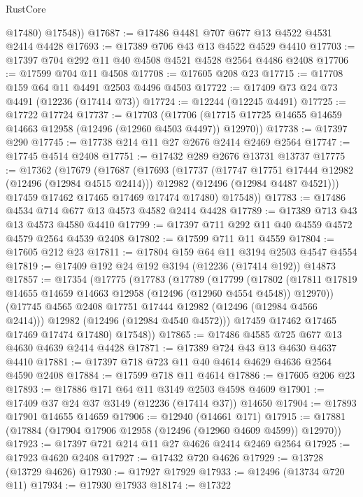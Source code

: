 \begin{lexlean}{RustCore}
\begin{coremodule}
          @17480)
        @17548))
@17687 := @17486 @4481 @707 @677 @13 @4522 @4531 @2414 @4428
@17693 := @17389 @706 @43 @13 @4522 @4529 @4410
@17703 := @17397 @704 @292 @11 @40 @4508 @4521 @4528 @2564 @4486 @2408
@17706 := @17599 @704 @11 @4508
@17708 := @17605 @208 @23
@17715 := @17708 @159 @64 @11 @4491 @2503 @4496 @4503
@17722 := @17409 @73 @24 @73 @4491 (@12236 (@17414 @73))
@17724 := @12244 (@12245 @4491)
@17725 := @17722 @17724
@17737 := @17703
    (@17706 (@17715 @17725 @14655 @14659 @14663 @12958 (@12496 (@12960 @4503 @4497)) @12970))
@17738 := @17397 @290
@17745 := @17738 @214 @11 @27 @2676 @2414 @2469 @2564
@17747 := @17745 @4514 @2408
@17751 := @17432 @289 @2676 @13731 @13737
@17775 := @17362
    (@17679
      (@17687
        (@17693
          (@17737
            (@17747 @17751 @17444 @12982 (@12496 (@12984 @4515 @2414)))
            @12982
            (@12496 (@12984 @4487 @4521)))
          @17459
          @17462
          @17465
          @17469
          @17474
          @17480)
        @17548))
@17783 := @17486 @4534 @714 @677 @13 @4573 @4582 @2414 @4428
@17789 := @17389 @713 @43 @13 @4573 @4580 @4410
@17799 := @17397 @711 @292 @11 @40 @4559 @4572 @4579 @2564 @4539 @2408
@17802 := @17599 @711 @11 @4559
@17804 := @17605 @212 @23
@17811 := @17804 @159 @64 @11 @3194 @2503 @4547 @4554
@17819 := @17409 @192 @24 @192 @3194 (@12236 (@17414 @192)) @14873
@17857 := @17354
    (@17775
      (@17783
        (@17789
          (@17799
            (@17802
              (@17811 @17819 @14655 @14659 @14663 @12958 (@12496 (@12960 @4554 @4548)) @12970))
            (@17745 @4565 @2408 @17751 @17444 @12982 (@12496 (@12984 @4566 @2414)))
            @12982
            (@12496 (@12984 @4540 @4572)))
          @17459
          @17462
          @17465
          @17469
          @17474
          @17480)
        @17548))
@17865 := @17486 @4585 @725 @677 @13 @4630 @4639 @2414 @4428
@17871 := @17389 @724 @43 @13 @4630 @4637 @4410
@17881 := @17397 @718 @723 @11 @40 @4614 @4629 @4636 @2564 @4590 @2408
@17884 := @17599 @718 @11 @4614
@17886 := @17605 @206 @23
@17893 := @17886 @171 @64 @11 @3149 @2503 @4598 @4609
@17901 := @17409 @37 @24 @37 @3149 (@12236 (@17414 @37)) @14650
@17904 := @17893 @17901 @14655 @14659
@17906 := @12940 (@14661 @171)
@17915 := @17881 (@17884 (@17904 @17906 @12958 (@12496 (@12960 @4609 @4599)) @12970))
@17923 := @17397 @721 @214 @11 @27 @4626 @2414 @2469 @2564
@17925 := @17923 @4620 @2408
@17927 := @17432 @720 @4626
@17929 := @13728 (@13729 @4626)
@17930 := @17927 @17929
@17933 := @12496 (@13734 @720 @11)
@17934 := @17930 @17933
@18174 := @17322

\end{coremodule}
\end{lexlean}
